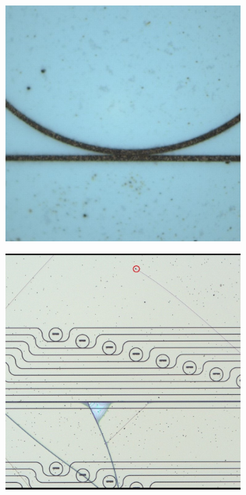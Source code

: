 \begin{figure}
\begin{subfigure}[b]{0.45\textwidth}
    \caption{}
    \end{subfigure}    
    \begin{subfigure}[b]{0.45\textwidth}
    \includegraphics[width=\textwidth]{imgs/jpg/SR_ac}
    \caption{}
    \end{subfigure}
    \begin{subfigure}[b]{0.45\textwidth}
    \includegraphics[width=\textwidth]{imgs/jpg/SR_tc}

\end{subfigure}
\end{figure}
